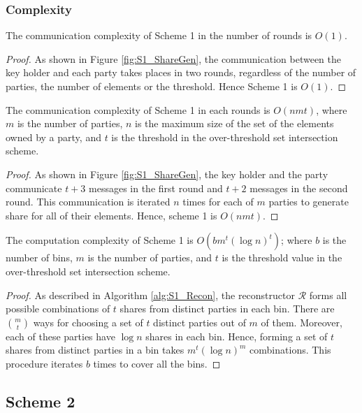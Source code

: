\subsubsection{Complexity}
\begin{theorem}
The communication complexity of Scheme 1 in the number of rounds is $O(1)$. 
\end{theorem}
\begin{proof}
As shown in Figure \ref{fig:S1_ShareGen}, the communication between the key holder and each party takes places in two rounds, regardless of the number of parties, the number of elements or the threshold. Hence Scheme 1 is $O(1)$. 
\end{proof}
\begin{theorem}
The communication complexity of Scheme 1 in each rounds is $O(nmt)$, where $m$ is the number of parties, $n$ is the maximum size of the set of the elements owned by a party, and $t$ is the threshold in the over-threshold set intersection scheme.  
\end{theorem}
\begin{proof}
As shown in Figure \ref{fig:S1_ShareGen}, the key holder and the party communicate $t+3$ messages in the first round and $t+2$ messages in the second round. This communication is iterated $n$ times for each of $m$ parties to generate share for all of their elements. Hence, scheme 1 is $O(nmt)$.  
\end{proof}
\begin{theorem}\label{S1_ComputationComplexity}
The computation complexity of Scheme 1 is $O(b m^t (\log{n})^t)$; where $b$ is the number of bins, $m$ is the number of parties, and $t$ is the threshold value in the over-threshold set intersection scheme.
\end{theorem}
\begin{proof}
As described in Algorithm \ref{alg:S1_Recon}, the reconstructor $\mathcal{R}$ forms all possible combinations of $t$ shares from distinct parties in each bin. There are $m \choose t$ ways for choosing a set of $t$ distinct parties out of $m$ of them. Moreover, each of these parties have $\log{n}$ shares in each bin. Hence, forming a set of $t$ shares from distinct parties in a bin takes $m^t (\log{n})^m$ combinations. This procedure iterates $b$ times to cover all the bins.  
\end{proof}

\subsection{Scheme 2}
